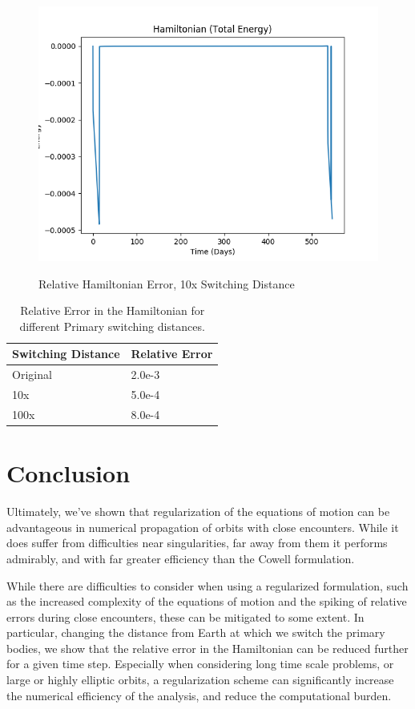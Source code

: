 \documentclass[11pt,twoside,letterpaper]{article}
\begin{document}
  \begin{figure}
    \caption{Relative Hamiltonian Error, 10x Switching Distance}
    \centering
    \includegraphics[width=\textwidth]{Hamiltonian}
    \label{ksham10}
  \end{figure}

  \begin{table}[] \label{switchTable}
    \centering
    \begin{tabular}{|l|l|}
      \hline
      Switching Distance & Relative Error \\ \hline
      Original & 2.0e-3 \\ \hline
      10x & 5.0e-4 \\ \hline
      100x & 8.0e-4 \\ \hline
    \end{tabular}
    \caption{Relative Error in the Hamiltonian for different Primary switching distances.}
  \end{table}

  \section{Conclusion}
  Ultimately, we've shown that regularization of the equations of
  motion can be advantageous in numerical propagation of orbits with
  close encounters. While it does suffer from difficulties near
  singularities, far away from them it performs admirably, and with
  far greater efficiency than the Cowell formulation.

  While there are difficulties to consider when using a regularized
  formulation, such as the increased complexity of the equations of
  motion and the spiking of relative errors during close encounters,
  these can be mitigated to some extent. In particular, changing the
  distance from Earth at which we switch the primary bodies, we show
  that the relative error in the Hamiltonian can be reduced further
  for a given time step. Especially when considering long time scale
  problems, or large or highly elliptic orbits, a regularization
  scheme can significantly increase the numerical efficiency of the
  analysis, and reduce the computational burden. 

  {}
  
\end{document}
